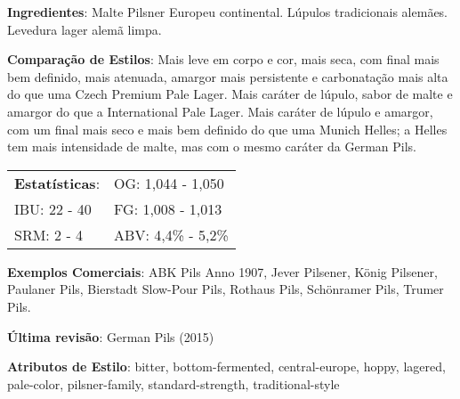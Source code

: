 \textbf{Ingredientes}: Malte Pilsner Europeu continental. Lúpulos tradicionais alemães. Levedura lager alemã limpa.

\textbf{Comparação de Estilos}: Mais leve em corpo e cor, mais seca, com final mais bem definido, mais atenuada, amargor mais persistente e carbonatação mais alta do que uma Czech Premium Pale Lager. Mais caráter de lúpulo, sabor de malte e amargor do que a International Pale Lager. Mais caráter de lúpulo e amargor, com um final mais seco e mais bem definido do que uma Munich Helles; a Helles tem mais intensidade de malte, mas com o mesmo caráter da German Pils.

\begin{tabular}{@{}p{35mm}p{35mm}@{}}
  \textbf{Estatísticas}: & OG: 1,044 - 1,050 \\
  IBU: 22 - 40  & FG: 1,008 - 1,013  \\
  SRM: 2 - 4  & ABV: 4,4\% - 5,2\%
\end{tabular}

\textbf{Exemplos Comerciais}: ABK Pils Anno 1907, Jever Pilsener, König Pilsener, Paulaner Pils, Bierstadt Slow-Pour Pils, Rothaus Pils, Schönramer Pils, Trumer Pils.

\textbf{Última revisão}: German Pils (2015)

\textbf{Atributos de Estilo}: bitter, bottom-fermented, central-europe, hoppy, lagered, pale-color, pilsner-family, standard-strength, traditional-style
